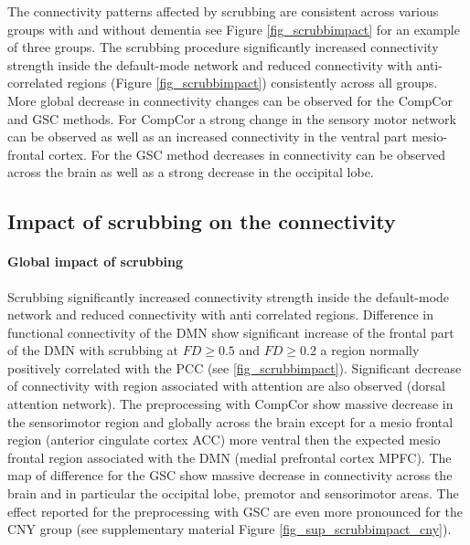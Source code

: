 The connectivity patterns affected by scrubbing are consistent across various groups with and without dementia see Figure \ref{fig_scrubbimpact} for an example of three groups. The scrubbing procedure significantly increased connectivity strength inside the default-mode network and reduced connectivity with anti-correlated regions (Figure  \ref{fig_scrubbimpact}) consistently across all groups. More global decrease in connectivity changes can be observed for the CompCor and GSC methods. For CompCor a strong change in the sensory motor network can be observed as well as an increased connectivity in the ventral part mesio-frontal cortex. For the GSC method decreases in connectivity can be observed across the brain as well as a strong decrease in the occipital lobe.


\subsection{Impact of scrubbing on the connectivity}
\paragraph{Global impact of scrubbing}
Scrubbing significantly increased connectivity strength inside the default-mode network and reduced connectivity with anti correlated regions. Difference in functional connectivity of the DMN show significant increase of the frontal part of the DMN with scrubbing at $FD\geq0.5$ and $FD\geq0.2$ a region normally positively correlated with the PCC (see \ref{fig_scrubbimpact}). Significant decrease of connectivity with region associated with attention are also observed (dorsal attention network). The preprocessing with CompCor show massive decrease in the sensorimotor region and globally across the brain except for a mesio frontal region (anterior cingulate cortex ACC) more ventral then the expected mesio frontal region associated with the DMN (medial prefrontal cortex MPFC). The map of difference for the GSC show massive decrease in connectivity across the brain and in particular the occipital lobe, premotor and sensorimotor areas. The effect reported for the preprocessing with GSC are even more pronounced for 
the CNY group (see supplementary material Figure \ref{fig_sup_scrubbimpact_cny}).


